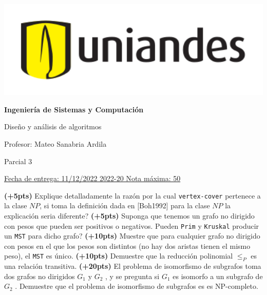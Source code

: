 \documentclass[12pt, a4paper]{exam}
\begin{document}
	\noindent
	\begin{minipage}[l]{0.1\textwidth}
		\noindent
		\includegraphics[width=1.8\textwidth]{Logosimbolo-uniandes_horizontal.png}
	\end{minipage}
\hfill
\begin{minipage}[c]{0.8\textwidth}
	\begin{center}
		{\large \textbf{Ingeniería de Sistemas y Computación} \par
		\large	Diseño y análisis de algoritmos	\par
		\small  Profesor: Mateo Sanabria Ardila	\par
		\small  Parcial 3	\par
		}
	\end{center}
\end{minipage}
\par
\vspace{0.2in}
\noindent
\uline{Fecha de entrega: 11/12/2022 	\hfill  2022-20		\hfill Nota máxima: 50}
\par 
\vspace{0.15in}

\begin{questions}
	\pointsdroppedatright
    \question \textbf{(+5pts)} Explique detalladamente la razón por la cual \texttt{vertex-cover} pertenece a la clase $NP$, si toma la definición dada en [Boh1992] para la clase $NP$ la explicación seria diferente?
    \question \textbf{(+5pts)} Suponga que tenemos un grafo no dirigido con pesos que pueden ser positivos o negativos. Pueden \texttt{Prim} y \texttt{Kruskal} producir un \texttt{MST} para dicho grafo?
    \question \textbf{(+10pts)} Muestre que para cualquier grafo no dirigido con pesos en el que los pesos son distintos (no hay dos aristas tienen el mismo peso), el \texttt{MST} es único.
    \question  \textbf{(+10pts)} Demuestre que la reducción polinomial $\leq_P$ es una relación transitiva.
    \question \textbf{(+20pts)} El problema de isomorfismo de subgrafos toma dos grafos no dirigidos $G_1$ y $G_2$ , y se pregunta si $G_1$ es isomorfo a un subgrafo de $G_2$ . Demuestre que el problema de isomorfismo de subgrafos es es NP-completo.
\end{questions}
\end{document}
